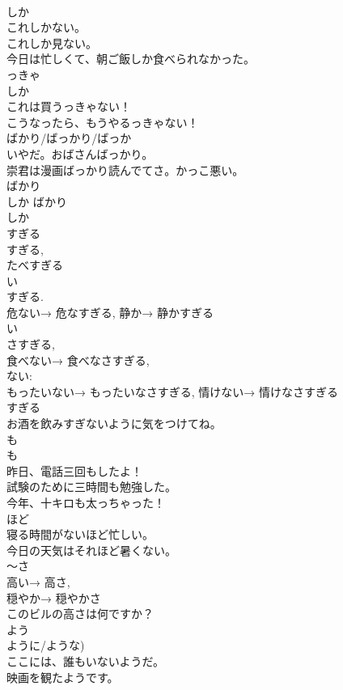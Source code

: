 \documentclass[8pt]{extreport}
\begin{document}
\begin{CJK}{UTF8}{min}
\\	しか	
\\	これしかない。
\\	これしか⾒ない。
\\	今日は忙しくて、朝ご飯しか食べられなかった。 
\\	っきゃ 
\\	しか 
\\	これは買うっきゃない！ 
\\	こうなったら、もうやるっきゃない！ 
\\	ばかり/ばっかり/ばっか 
\\	いやだ。おばさんばっかり。
\\	崇君は漫画ばっかり読んでてさ。かっこ悪い。
\\	ばかり　
\\	しか	ばかり 
\\	しか 
\\	すぎる	
\\	すぎる, 
\\	たべすぎる 
\\	い 
\\	すぎる. 
\\	危ない→ 危なすぎる, 静か→ 静かすぎる 
\\	い 
\\	さすぎる, 
\\	食べない→ 食べなさすぎる,  
\\	ない:  
\\	もったいない→ もったいなさすぎる, 情けない→ 情けなさすぎる	
\\	すぎる 
\\	お酒を飲みすぎないように気をつけてね。
\\	も 
\\	も 
\\	昨日、電話三回もしたよ！
\\	試験のために三時間も勉強した。
\\	今年、十キロも太っちゃった！ 
\\	ほど	
\\	寝る時間がないほど忙しい。
\\	今日の天気はそれほど暑くない。
\\	～さ 
\\	高い→ 高さ, 
\\	穏やか→ 穏やかさ 
\\	このビルの高さは何ですか？ 
\\	よう 
\\	ように/ような)	
\\	ここには、誰もいないようだ。
\\	映画を観たようです。

\end{CJK}
\end{document}
